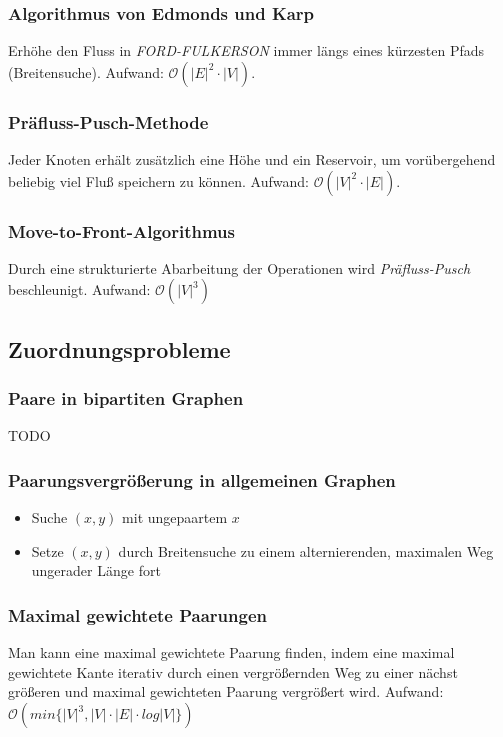 \subsubsection{Algorithmus von Edmonds und Karp}
Erhöhe den Fluss in \textit{FORD-FULKERSON} immer längs eines kürzesten Pfads (Breitensuche). Aufwand: \(\mathcal{O} (|E|^2 \cdot |V|)\).

\subsubsection{Präfluss-Pusch-Methode}
Jeder Knoten erhält zusätzlich eine Höhe und ein Reservoir, um vorübergehend beliebig viel Fluß speichern zu können. Aufwand: \(\mathcal{O} (|V|^2 \cdot |E|)\).

\subsubsection{Move-to-Front-Algorithmus}
Durch eine strukturierte Abarbeitung der Operationen wird \textit{Präfluss-Pusch} beschleunigt. Aufwand: \(\mathcal{O}(|V|^3)\)


\subsection{Zuordnungsprobleme}

\subsubsection{Paare in bipartiten Graphen}
TODO

\subsubsection{Paarungsvergrößerung in allgemeinen Graphen}
\begin{itemize}
	\item Suche \((x,y)\) mit ungepaartem \(x\)
	\item Setze \((x,y)\) durch Breitensuche zu einem alternierenden, maximalen Weg ungerader Länge fort
\end{itemize}

\subsubsection{Maximal gewichtete Paarungen}
Man kann eine maximal gewichtete Paarung finden, indem eine maximal gewichtete Kante iterativ durch einen vergrößernden Weg zu einer nächst größeren und maximal gewichteten Paarung vergrößert wird. Aufwand: \(\mathcal{O}(min\{|V|^3, |V| \cdot |E| \cdot log|V|\})\)

